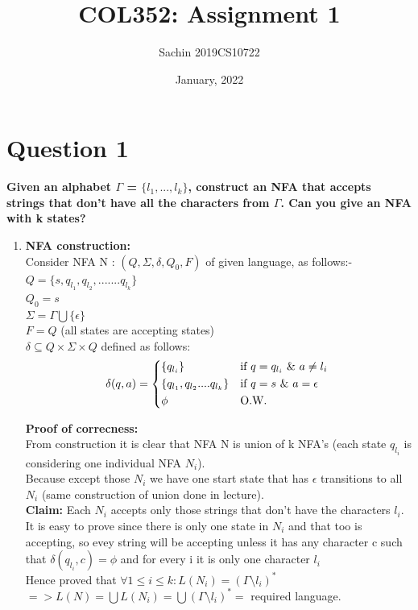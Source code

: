 \documentclass{article}
\title{COL352: Assignment 1}
\author{Sachin 2019CS10722 }
\date{January, 2022}
\begin{document}
\maketitle

\section{Question 1}

\textbf{Given an alphabet $\Gamma $ = $\{l_1,...,l_k\}$, construct an NFA that accepts strings that don't have
all the characters from $\Gamma $. Can you give an NFA with k states?}\\

\begin{enumerate}
    \item \textbf{NFA construction: }\\
Consider NFA N : $(Q, \Sigma, \delta, Q_0 , F )$ of given language, as follows:- \\
$Q =  \{s, q_{l_1}, q_{l_2}, ....... q_{l_k}\}$\\
$Q_0 = s$\\
$\Sigma = \Gamma \bigcup \{\epsilon\}$\\
$F = Q$ (all states are accepting states)\\
$\delta \subseteq Q \times \Sigma \times Q$ defined as follows:\\

\begin{equation}
    \delta (q,a) = 
    \begin{cases*}
        \{q_{l_i}\} & if $ q = q_{l_i} \text{ } \& \text{ } a \neq l_i$ \\
        \{q_{l_1}, q_{l_2} .... q_{l_k}\} & if $ q = s \text{ } \& \text{ }a = \epsilon$\\
        \phi & O.W.
    \end{cases*}
\end{equation}


\textbf{Proof of correcness: }\\
From construction it is clear that NFA N is union of k NFA's (each state $q_{l_i}$ is considering one individual NFA $N_i$).\\
Because except those $N_i$ we have one start state that has $\epsilon$ transitions to all $N_i$ (same construction of union done in lecture).\\

\textbf{Claim: } Each $N_i$ accepts only those strings that don't have the characters $l_{i}$.\\
It is easy to prove since there is only one state in $N_i$ and that too is accepting, so evey string will be accepting unless it has any character c such that $\delta(q_{l_i},c) = \phi$ and 
for every i it is only one character $l_i$\\
Hence proved that $\forall 1 \leq i \leq k : L(N_i) = (\Gamma \setminus {l_i})^{*} $\\
$=> L(N) = \bigcup L(N_i) = \bigcup (\Gamma \setminus {l_i})^{*} = $ required language.\\


\end{enumerate}
\end{document}
